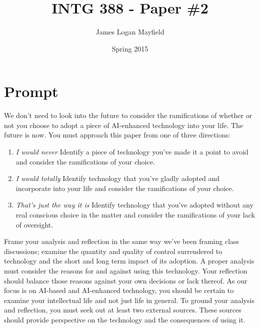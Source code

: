 \documentclass[]{tufte-handout}
\title{INTG 388 - Paper \#2 }
\author{James Logan Mayfield}
\date{ Spring 2015 }
\begin{document}
\maketitle

\section{Prompt}

We don't need to look into the future to consider the ramifications of whether or not you choose to adopt a piece of AI-enhanced technology into your life.  The future is now.  You must approach this paper from one of three directions:

\begin{enumerate}
\item \textit{I would never} \newline
Identify a piece of technology you've made it a point to avoid and consider the ramifications of your choice.

\item \textit{I would totally} \newline
Identify technology that you've gladly adopted and incorporate into your life and consider the ramifications of your choice. 

\item \textit{That's just the way it is} \newline
Identify technology that you've adopted without any real conscious choice in the matter and consider the ramifications of your lack of oversight. 
\end{enumerate}

Frame your analysis and reflection in the same way we've been framing class discussions; examine the quantity and quality of control surrendered to technology and the short and long term impact of its adoption. A proper analysis must consider the reasons for and against using this technology. Your reflection should balance those reasons against your own decisions or lack thereof. As our focus is on AI-based and AI-enhanced technology, you should be certain to examine your intellectual life and not just life in general. To ground your analysis and reflection, you must seek out at least two external sources. These sources should provide perspective on the technology and the consequences of using it. 
\end{document}
